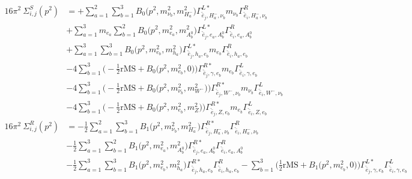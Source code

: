 \begin{itemize}
\begin{align} 
16\pi^2 \ \Sigma^S_{i,j}(p^2) &= +\sum_{a=1}^{2}\sum_{b=1}^{3}{B_0\Big(p^{2},m^2_{\nu_{{b}}},m^2_{H^-_{{a}}}\Big)} {\Gamma^{L*}_{\check{\bar{e}}_{{j}},H^-_{{a}},\nu_{{b}}}} m_{\nu_{{b}}} {\Gamma^R_{\check{\bar{e}}_{{i}},H^-_{{a}},\nu_{{b}}}} \nonumber \\ 
 &+\sum_{a=1}^{3}m_{e_{{a}}} \sum_{b=1}^{2}{B_0\Big(p^{2},m^2_{e_{{a}}},m^2_{A^0_{{b}}}\Big)} {\Gamma^{L*}_{\check{\bar{e}}_{{j}},e_{{a}},A^0_{{b}}}} {\Gamma^R_{\check{\bar{e}}_{{i}},e_{{a}},A^0_{{b}}}}  \nonumber \\ 
 &+\sum_{a=1}^{3}\sum_{b=1}^{3}{B_0\Big(p^{2},m^2_{e_{{b}}},m^2_{h_{{a}}}\Big)} {\Gamma^{L*}_{\check{\bar{e}}_{{j}},h_{{a}},e_{{b}}}} m_{e_{{b}}} {\Gamma^R_{\check{\bar{e}}_{{i}},h_{{a}},e_{{b}}}} \nonumber \\ 
 &-4 \sum_{b=1}^{3}\Big(-\frac{1}{2} \text{rMS}  + {B_0\Big(p^{2},m^2_{e_{{b}}},0\Big)}\Big){\Gamma^{R*}_{\check{\bar{e}}_{{j}},\gamma,e_{{b}}}} m_{e_{{b}}} {\Gamma^L_{\check{\bar{e}}_{{i}},\gamma,e_{{b}}}}  \nonumber \\ 
 &-4 \sum_{b=1}^{3}\Big(-\frac{1}{2} \text{rMS}  + {B_0\Big(p^{2},m^2_{\nu_{{b}}},m^2_{W^-}\Big)}\Big){\Gamma^{R*}_{\check{\bar{e}}_{{j}},W^-,\nu_{{b}}}} m_{\nu_{{b}}} {\Gamma^L_{\check{\bar{e}}_{{i}},W^-,\nu_{{b}}}}  \nonumber \\ 
 &-4 \sum_{b=1}^{3}\Big(-\frac{1}{2} \text{rMS}  + {B_0\Big(p^{2},m^2_{e_{{b}}},m^2_{Z}\Big)}\Big){\Gamma^{R*}_{\check{\bar{e}}_{{j}},Z,e_{{b}}}} m_{e_{{b}}} {\Gamma^L_{\check{\bar{e}}_{{i}},Z,e_{{b}}}}  \\ 
16\pi^2 \ \Sigma^R_{i,j}(p^2) &= -\frac{1}{2} \sum_{a=1}^{2}\sum_{b=1}^{3}{B_1\Big(p^{2},m^2_{\nu_{{b}}},m^2_{H^-_{{a}}}\Big)} {\Gamma^{R*}_{\check{\bar{e}}_{{j}},H^-_{{a}},\nu_{{b}}}} {\Gamma^R_{\check{\bar{e}}_{{i}},H^-_{{a}},\nu_{{b}}}}  \nonumber \\ 
 &-\frac{1}{2} \sum_{a=1}^{3}\sum_{b=1}^{2}{B_1\Big(p^{2},m^2_{e_{{a}}},m^2_{A^0_{{b}}}\Big)} {\Gamma^{R*}_{\check{\bar{e}}_{{j}},e_{{a}},A^0_{{b}}}} {\Gamma^R_{\check{\bar{e}}_{{i}},e_{{a}},A^0_{{b}}}}  \nonumber \\ 
 &-\frac{1}{2} \sum_{a=1}^{3}\sum_{b=1}^{3}{B_1\Big(p^{2},m^2_{e_{{b}}},m^2_{h_{{a}}}\Big)} {\Gamma^{R*}_{\check{\bar{e}}_{{j}},h_{{a}},e_{{b}}}} {\Gamma^R_{\check{\bar{e}}_{{i}},h_{{a}},e_{{b}}}}  - \sum_{b=1}^{3}\Big(\frac{1}{2} \text{rMS}  + {B_1\Big(p^{2},m^2_{e_{{b}}},0\Big)}\Big){\Gamma^{L*}_{\check{\bar{e}}_{{j}},\gamma,e_{{b}}}} {\Gamma^L_{\check{\bar{e}}_{{i}},\gamma,e_{{b}}}}  \nonumber \\ 

\end{align}
\end{itemize}

